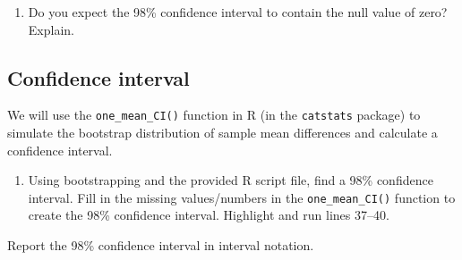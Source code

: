 \documentclass[
]{report}
\newenvironment{Shaded}{\begin{snugshade}}{\end{snugshade}}
\newcommand{\AttributeTok}[1]{\textcolor[rgb]{0.13,0.29,0.53}{#1}}
\newcommand{\CommentTok}[1]{\textcolor[rgb]{0.56,0.35,0.01}{\textit{#1}}}
\newcommand{\DecValTok}[1]{\textcolor[rgb]{0.00,0.00,0.81}{#1}}
\newcommand{\FunctionTok}[1]{\textcolor[rgb]{0.13,0.29,0.53}{\textbf{#1}}}
\newcommand{\NormalTok}[1]{#1}
\newcommand{\SpecialCharTok}[1]{\textcolor[rgb]{0.81,0.36,0.00}{\textbf{#1}}}
\newcommand{\StringTok}[1]{\textcolor[rgb]{0.31,0.60,0.02}{#1}}
\providecommand{\tightlist}{%
  \setlength{\itemsep}{0pt}\setlength{\parskip}{0pt}}
\begin{document}
\vspace{0.5in}

\begin{enumerate}
\def\labelenumi{\arabic{enumi}.}
\setcounter{enumi}{11}
\tightlist
\item
  Do you expect the 98\% confidence interval to contain the null value of zero? Explain.
\end{enumerate}

\vspace{0.8in}

\subsection*{Confidence interval}\label{confidence-interval-1}

We will use the \texttt{one\_mean\_CI()} function in R (in the \texttt{catstats} package) to simulate the bootstrap distribution of sample mean differences and calculate a confidence interval.

\begin{enumerate}
\def\labelenumi{\arabic{enumi}.}
\setcounter{enumi}{12}
\tightlist
\item
  Using bootstrapping and the provided R script file, find a 98\% confidence interval. Fill in the missing values/numbers in the \texttt{one\_mean\_CI()} function to create the 98\% confidence interval. Highlight and run lines 37--40.
\end{enumerate}

\begin{Shaded}
\end{Shaded}

Report the 98\% confidence interval in interval notation.

\vspace{0.3in}
\end{document}
